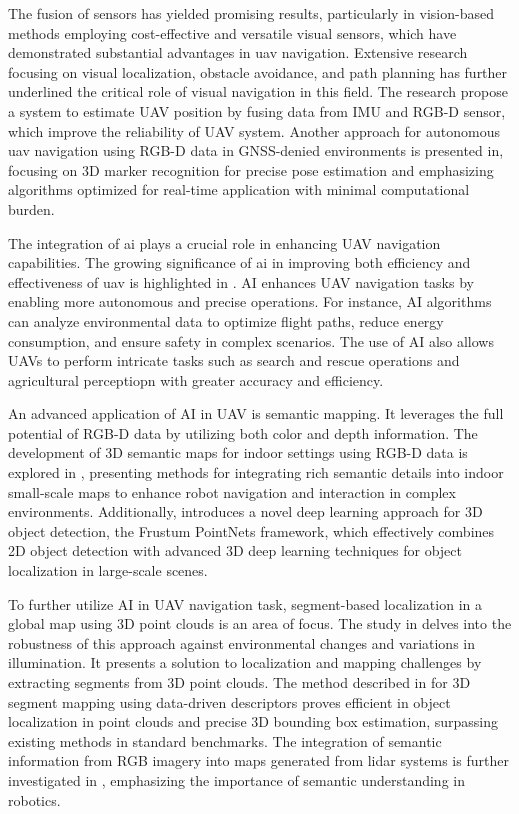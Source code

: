 The fusion of sensors has yielded promising results, particularly in vision-based methods employing cost-effective and versatile visual sensors, which have demonstrated substantial advantages in \acrshort{uav} navigation\cite{survey_uav_nav,}. Extensive research focusing on visual localization\cite{visual_localization}, obstacle avoidance\cite{obstacle_av}, and path planning\cite{path_plan} has further underlined the critical role of visual navigation in this field. The research\cite{fusion_rgbd1} propose a system to estimate UAV position by fusing data from IMU and RGB-D sensor, which improve the reliability of UAV system. Another approach for autonomous \acrshort{uav} navigation using RGB-D data in GNSS-denied environments is presented in\cite{7152290}, focusing on 3D marker recognition for precise pose estimation and emphasizing algorithms optimized for real-time application with minimal computational burden. 

The integration of \acrfull{ai} plays a crucial role in enhancing UAV navigation capabilities. The growing significance of \acrshort{ai} in improving both efficiency and effectiveness of \acrshort{uav} is highlighted in \cite{AI_UAV_review}. AI enhances UAV navigation tasks by enabling more autonomous and precise operations. For instance, AI algorithms can analyze environmental data to optimize flight paths, reduce energy consumption, and ensure safety in complex scenarios. The use of AI also allows UAVs to perform intricate tasks such as search and rescue operations\cite{ai_disa} and agricultural perceptiopn\cite{ai_agri} with greater accuracy and efficiency.

An advanced application of AI in UAV is semantic mapping. It leverages the full potential of RGB-D data by utilizing both color and depth information. The development of 3D semantic maps for indoor settings using RGB-D data is explored in \cite{Zhao2016Building3S}, presenting methods for integrating rich semantic details into indoor small-scale maps to enhance robot navigation and interaction in complex environments. Additionally, \cite{qi2018frustum} introduces a novel deep learning approach for 3D object detection, the Frustum PointNets framework, which effectively combines 2D object detection with advanced 3D deep learning techniques for object localization in large-scale scenes.

To further utilize AI in UAV navigation task, segment-based localization in a global map using 3D point clouds is an area of focus. The study in \cite{segmatch2017} delves into the robustness of this approach against environmental changes and variations in illumination. It presents a solution to localization and mapping challenges by extracting segments from 3D point clouds. The method described in \cite{segmap} for 3D segment mapping using data-driven descriptors proves efficient in object localization in point clouds and precise 3D bounding box estimation, surpassing existing methods in standard benchmarks. The integration of semantic information from RGB imagery into maps generated from \acrshort{lidar} systems is further investigated in \cite{cramariuc2021semsegmap}, emphasizing the importance of semantic understanding in robotics. 

